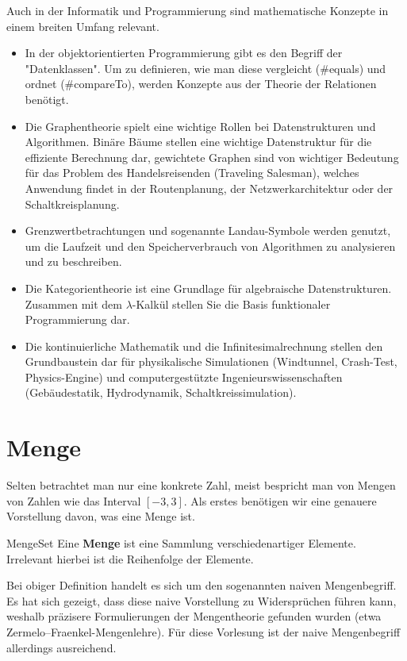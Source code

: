 Auch in der Informatik und Programmierung sind mathematische Konzepte in einem breiten Umfang relevant.

\begin{itemize}
	\item In der objektorientierten Programmierung gibt es den Begriff der "Datenklassen". Um zu definieren, wie man diese vergleicht (\#equals) und ordnet (\#compareTo), werden Konzepte aus der Theorie der Relationen benötigt.
	\item Die Graphentheorie spielt eine wichtige Rollen bei Datenstrukturen und Algorithmen. Binäre Bäume stellen eine wichtige Datenstruktur für die effiziente Berechnung dar, gewichtete Graphen sind von wichtiger Bedeutung für das Problem des Handelsreisenden (Traveling Salesman), welches Anwendung findet in der Routenplanung, der Netzwerkarchitektur oder der Schaltkreisplanung.
	\item Grenzwertbetrachtungen und sogenannte Landau-Symbole werden genutzt, um die Laufzeit und den Speicherverbrauch von Algorithmen zu analysieren und zu beschreiben.
	\item Die Kategorientheorie ist eine Grundlage für algebraische Datenstrukturen. Zusammen mit dem $\lambda$-Kalkül stellen Sie die Basis funktionaler Programmierung dar.
	\item Die kontinuierliche Mathematik und die Infinitesimalrechnung stellen den Grundbaustein dar für physikalische Simulationen (Windtunnel, Crash-Test, Physics-Engine) und computergestützte Ingenieurswissenschaften (Gebäudestatik, Hydrodynamik, Schaltkreissimulation).
\end{itemize}

\section{Menge}

Selten betrachtet man nur eine konkrete Zahl, meist bespricht man von Mengen von Zahlen wie das Interval $[-3,3]$.  Als erstes benötigen wir eine genauere Vorstellung davon, was eine Menge ist.

\begin{definition}{Menge}{Set}
    Eine \textbf{Menge} ist eine Sammlung verschiedenartiger Elemente. Irrelevant hierbei ist die Reihenfolge der Elemente.
\end{definition}

Bei obiger Definition handelt es sich um den sogenannten naiven Mengenbegriff. Es hat sich gezeigt, dass diese naive Vorstellung zu Widersprüchen führen kann, weshalb präzisere Formulierungen der Mengentheorie gefunden wurden (etwa Zermelo–Fraenkel-Mengenlehre). Für diese Vorlesung ist der naive Mengenbegriff allerdings ausreichend.

